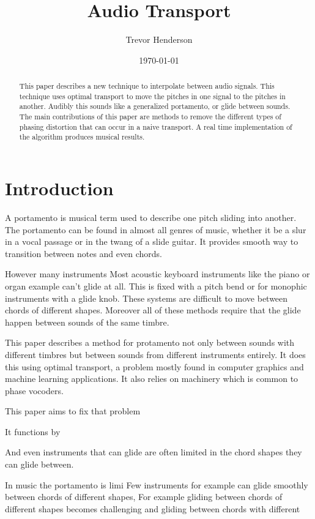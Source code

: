 \documentclass[12pt]{article}
\title{Audio Transport}
\date{\today}
\author{Trevor Henderson}
\begin{document}
\maketitle

\begin{abstract}
  This paper describes a new technique to interpolate between audio signals.
  This technique uses optimal transport to move the pitches in one signal to the pitches in another.
  Audibly this sounds like a generalized portamento, or glide between sounds.
  The main contributions of this paper are methods to remove the different types of phasing distortion that can occur in a naive transport.
  A real time implementation of the algorithm produces musical results.
\end{abstract}

\section{Introduction}

A portamento is musical term used to describe one pitch sliding into another.
The portamento can be found in almost all genres of music, 
whether it be a slur in a vocal passage or in the twang of a slide guitar.
It provides smooth way to transition between notes and even chords.

However many instruments 
Most acoustic keyboard instruments like the piano or organ example can't glide at all. 
This is fixed with a pitch bend or for monophic instruments with a glide knob.
These systems are difficult to move between chords of different shapes.
Moreover all of these methods require that the glide happen between sounds of the same timbre.

This paper describes a method for protamento not only between sounds with different timbres but between sounds from different instruments entirely.
It does this using optimal transport, a problem mostly found in computer graphics and machine learning applications. 
It also relies on machinery which is common to phase vocoders.


This paper aims to fix that problem

It functions by 


And even instruments that can glide are often limited in the chord shapes they can glide between. 



In music the portamento is limi
Few instruments for example can glide smoothly between chords of different shapes, 
For example gliding between  chords of different shapes becomes challenging and gliding between chords with different
\end{document}
